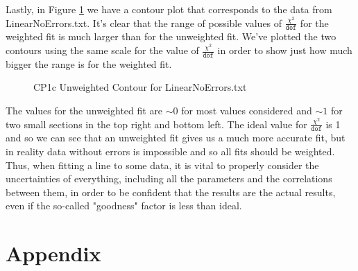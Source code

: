 \documentclass[12pt]{article}
\begin{document}
    \newpage\noindent
    Lastly, in Figure \ref{fig:CP1c_Contour_Plot} we have a contour plot that corresponds to 
    the data from LinearNoErrors.txt. It's clear that the range of possible values of 
    $\frac{\chi^2}{\texttt{dof}}$ for the weighted fit is much larger than for the unweighted fit. 
    We've plotted the two contours using the same scale for the value of $\frac{\chi^2}{\texttt{dof}}$ 
    in order to show just how much bigger the range is for the weighted fit. 

    \begin{figure}[H]
        \begin{center}
           \scalebox{.7}{}
           \caption{CP1c Unweighted Contour for LinearNoErrors.txt}
           \label{fig:CP1c_Contour_Plot}
        \end{center}
    \end{figure}
    
    \noindent
    The values for the unweighted fit are $\sim0$ for most values considered and $\sim1$ for 
    two small sections in the top right and bottom left. The ideal value for 
    $\frac{\chi^2}{\texttt{dof}}$ is 1 and so we can see that an unweighted fit gives us a 
    much more accurate fit, but in reality data without errors is impossible and so all fits 
    should be weighted. Thus, when fitting a line to some data, it is vital to properly consider 
    the uncertainties of everything, including all the parameters and the correlations between 
    them, in order to be confident that the results are the actual results, even if the so-called 
    "goodness" factor is less than ideal. 
    
    \newpage
    \section{Appendix}
    
    
    
\end{document}
